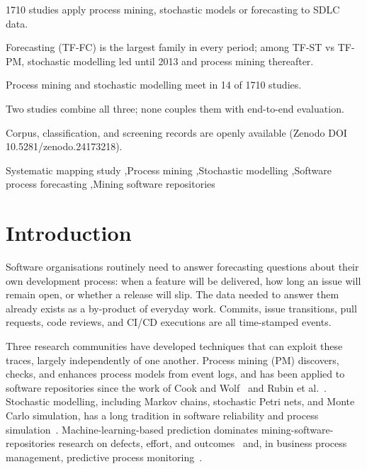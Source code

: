 \documentclass[preprint,12pt,authoryear=false]{elsarticle}
\begin{document}
\begin{frontmatter}
\begin{highlights}
\item 1710 studies apply process mining, stochastic models or forecasting to SDLC data.
\item Forecasting (TF-FC) is the largest family in every period; among TF-ST vs TF-PM, stochastic modelling led until 2013 and process mining thereafter.
\item Process mining and stochastic modelling meet in 14 of 1710 studies.
\item Two studies combine all three; none couples them with end-to-end evaluation.
\item Corpus, classification, and screening records are openly available (Zenodo DOI 10.5281/zenodo.24173218).
\end{highlights}

\begin{keyword}
Systematic mapping study \sep Process mining \sep Stochastic modelling \sep Software process forecasting \sep Mining software repositories
\end{keyword}

\end{frontmatter}

\section{Introduction}\label{sec:intro}

Software organisations routinely need to answer forecasting questions about their own development process: when a feature will be delivered, how long an issue will remain open, or whether a release will slip. The data needed to answer them already exists as a by-product of everyday work. Commits, issue transitions, pull requests, code reviews, and CI/CD executions are all time-stamped events.

Three research communities have developed techniques that can exploit these traces, largely independently of one another. Process mining (PM) discovers, checks, and enhances process models from event logs, and has been applied to software repositories since the work of Cook and Wolf~\cite{cook1995,cook1998} and Rubin et al.~\cite{rubin2007}. Stochastic modelling, including Markov chains, stochastic Petri nets, and Monte Carlo simulation, has a long tradition in software reliability and process simulation~\cite{whittaker1994,ali2014}. Machine-learning-based prediction dominates mining-software-repositories research on defects, effort, and outcomes~\cite{kagdi2007,hall2012} and, in business process management, predictive process monitoring~\cite{marquez2018}.
\end{document}
